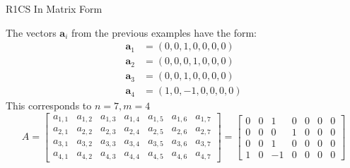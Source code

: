 \documentclass{beamer}
\begin{document}
    \begin{frame}{R1CS In Matrix Form}
        \begin{example}
            The vectors $\mathbf{a}_i$ from the previous examples have the form:
            {\small\begin{align*}
                \mathbf{a}_1 &= (0, 0, 1, 0, 0, 0, 0) \\
                \mathbf{a}_2 &= (0, 0, 0, 1, 0, 0, 0) \\
                \mathbf{a}_3 &= (0, 0, 1, 0, 0, 0, 0) \\
                \mathbf{a}_4 &= (1, 0, -1, 0, 0, 0, 0)
            \end{align*}}
            This corresponds to $n = 7, m = 4$
            {\small \begin{equation*}
                A = \begin{bmatrix}
                    a_{1,1} & a_{1,2} & a_{1,3} & a_{1,4} & a_{1,5} & a_{1,6} & a_{1,7} \\
                    a_{2,1} & a_{2,2} & a_{2,3} & a_{2,4} & a_{2,5} & a_{2,6} & a_{2,7} \\
                    a_{3,1} & a_{3,2} & a_{3,3} & a_{3,4} & a_{3,5} & a_{3,6} & a_{3,7} \\
                    a_{4,1} & a_{4,2} & a_{4,3} & a_{4,4} & a_{4,5} & a_{4,6} & a_{4,7}
                \end{bmatrix} = \begin{bmatrix}
                    0 & 0 & 1 & 0 & 0 & 0 & 0 \\
                    0 & 0 & 0 & 1 & 0 & 0 & 0 \\
                    0 & 0 & 1 & 0 & 0 & 0 & 0 \\
                    1 & 0 & -1 & 0 & 0 & 0 & 0 
                \end{bmatrix}
            \end{equation*}}
        \end{example}
    \end{frame}
\end{document}
